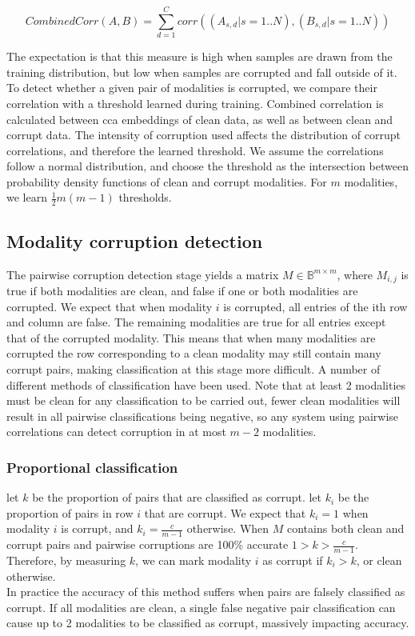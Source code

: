 $$CombinedCorr(A, B) = \sum_{d=1}^C{corr((A_{s,d} | s=1..N), (B_{s,d} | s=1..N))}$$

The expectation is that this measure is high when samples are drawn from the training distribution, but low when samples are corrupted and fall outside of it.\\

To detect whether a given pair of modalities is corrupted, we compare their correlation with a threshold learned during training. Combined correlation is calculated between cca embeddings of clean data, as well as between clean and corrupt data. The intensity of corruption used affects the distribution of corrupt correlations, and therefore the learned threshold. We assume the correlations follow a normal distribution, and choose the threshold as the intersection between probability density functions of clean and corrupt modalities. For $m$ modalities, we learn $\frac{1}{2}m(m-1)$ thresholds.\\


\subsection{Modality corruption detection}
The pairwise corruption detection stage yields a matrix $M\in\mathbb{B}^{m\times m}$, where $M_{i,j}$ is true if both modalities are clean, and false if one or both modalities are corrupted. We expect that when modality $i$ is corrupted, all entries of the ith row and column are false. The remaining modalities are true for all entries except that of the corrupted modality. This means that when many modalities are corrupted the row corresponding to a clean modality may still contain many corrupt pairs, making classification at this stage more difficult. A number of different methods of classification have been used. Note that at least 2 modalities must be clean for any classification to be carried out, fewer clean modalities will result in all pairwise classifications being negative, so any system using pairwise correlations can detect corruption in at most $m-2$ modalities.

\subsubsection{Proportional classification}
let $k$ be the proportion of pairs that are classified as corrupt. let $k_i$ be the proportion of pairs in row $i$ that are corrupt. We expect that $k_i = 1$ when modality $i$ is corrupt, and $k_i = \frac{c}{m-1}$ otherwise. When $M$ contains both clean and corrupt pairs and pairwise corruptions are 100\% accurate $1>k>\frac{c}{m-1}$. Therefore, by measuring $k$, we can mark modality $i$ as corrupt if $k_i > k$, or clean otherwise.\\
In practice the accuracy of this method suffers when pairs are falsely classified as corrupt. If all modalities are clean, a single false negative pair classification can cause up to 2 modalities to be classified as corrupt, massively impacting accuracy.

